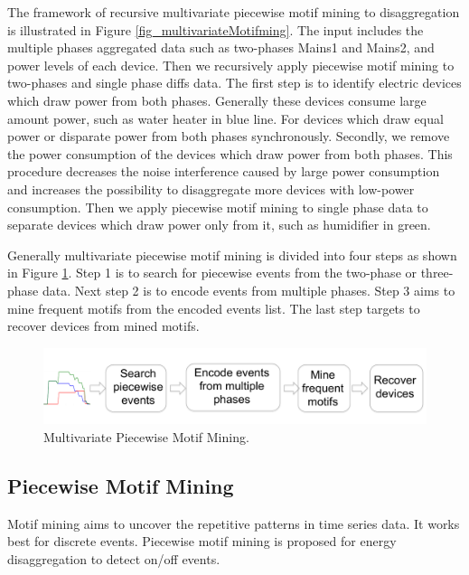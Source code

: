 The framework of recursive multivariate piecewise motif mining to disaggregation is illustrated in Figure \ref{fig_multivariateMotifming}. 
The input includes the multiple phases aggregated data such as two-phases Mains1 and Mains2, 
and power levels of each device. 
Then we recursively apply piecewise motif mining to two-phases and single phase diffs data.
The first step is to identify electric devices which draw power from both phases.
Generally these devices consume large amount power, such as water heater in blue line.
For devices which draw equal power or disparate power from both phases synchronously. 
Secondly, we remove the power consumption of the devices which draw power from both phases.
This procedure decreases the noise interference caused by large power consumption 
and increases the possibility to disaggregate more devices with low-power consumption. 
Then we apply piecewise motif mining to single phase data to separate 
devices which draw power only from it, 
such as humidifier in green. 

Generally multivariate piecewise motif mining is divided into four steps as shown in Figure \ref{fig_multivariatePiecewiseMotifMining}.
Step 1 is to search for piecewise events from the two-phase or three-phase data.
Next step 2 is to encode events from multiple phases. 
Step 3 aims to mine frequent motifs from the encoded events list.
The last step targets to recover devices from mined motifs. 
\begin{figure}[h]
\centering
\includegraphics[width=6.6in]{multidisaggfig/multivariatePiecewiseMotifMining.pdf}
\caption{Multivariate Piecewise Motif Mining.}
\label{fig_multivariatePiecewiseMotifMining}
\end{figure}

\subsection{Piecewise Motif Mining}
Motif mining aims to uncover the repetitive patterns in time series data. 
It works best for discrete events. Piecewise motif mining is proposed 
for energy disaggregation to detect on/off events. 

